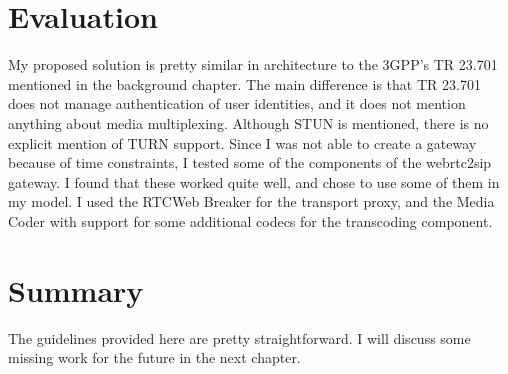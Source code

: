 \section{Evaluation}
My proposed solution is pretty similar in architecture to the 3GPP's TR 23.701\cite{3gpp-wrtc-access-ims} mentioned in the background chapter. The main difference is that TR 23.701 does not manage authentication of user identities, and it does not mention anything about media multiplexing. Although STUN is mentioned, there is no explicit mention of TURN support. Since I was not able to create a gateway because of time constraints, I tested some of the components of the webrtc2sip gateway. I found that these worked quite well, and chose to use some of them in my model. I used the RTCWeb Breaker for the transport proxy, and the Media Coder with support for some additional codecs for the transcoding component.

\section{Summary}
The guidelines provided here are pretty straightforward. I will discuss some missing work for the future in the next chapter.
